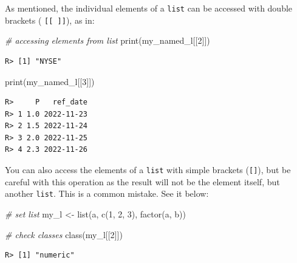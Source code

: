 \documentclass[
  12pt,
]{book}
\newenvironment{Shaded}{\begin{snugshade}}{\end{snugshade}}
\newcommand{\CommentTok}[1]{\textcolor[rgb]{0.37,0.37,0.37}{\textit{#1}}}
\newcommand{\DecValTok}[1]{\textcolor[rgb]{0.06,0.06,0.06}{#1}}
\newcommand{\FunctionTok}[1]{\textcolor[rgb]{0,0,0}{#1}}
\newcommand{\NormalTok}[1]{#1}
\newcommand{\OtherTok}[1]{\textcolor[rgb]{0.37,0.37,0.37}{#1}}
\newcommand{\StringTok}[1]{\textcolor[rgb]{0.5,0.5,0.5}{#1}}
\begin{document}
As mentioned, the individual elements of a \texttt{list} can be accessed with double brackets ( \texttt{{[}{[}\ {]}{]}}), as in: \index{[[ ]]}

\begin{Shaded}
\begin{Highlighting}[]
\CommentTok{\# accessing elements from list}
\FunctionTok{print}\NormalTok{(my\_named\_l[[}\DecValTok{2}\NormalTok{]])}
\end{Highlighting}
\end{Shaded}

\begin{verbatim}
R> [1] "NYSE"
\end{verbatim}

\begin{Shaded}
\begin{Highlighting}[]
\FunctionTok{print}\NormalTok{(my\_named\_l[[}\DecValTok{3}\NormalTok{]])}
\end{Highlighting}
\end{Shaded}

\begin{verbatim}
R>     P   ref_date
R> 1 1.0 2022-11-23
R> 2 1.5 2022-11-24
R> 3 2.0 2022-11-25
R> 4 2.3 2022-11-26
\end{verbatim}

You can also access the elements of a \texttt{list} with simple brackets (\texttt{{[}{]}}), but be careful with this operation as the result will not be the element itself, but another \texttt{list}. This is a common mistake. See it below:

\begin{Shaded}
\begin{Highlighting}[]
\CommentTok{\# set list}
\NormalTok{my\_l }\OtherTok{\textless{}{-}} \FunctionTok{list}\NormalTok{(}\StringTok{\textquotesingle{}a\textquotesingle{}}\NormalTok{,}
             \FunctionTok{c}\NormalTok{(}\DecValTok{1}\NormalTok{, }\DecValTok{2}\NormalTok{, }\DecValTok{3}\NormalTok{),}
             \FunctionTok{factor}\NormalTok{(}\StringTok{\textquotesingle{}a\textquotesingle{}}\NormalTok{, }\StringTok{\textquotesingle{}b\textquotesingle{}}\NormalTok{))}

\CommentTok{\# check classes}
\FunctionTok{class}\NormalTok{(my\_l[[}\DecValTok{2}\NormalTok{]])}
\end{Highlighting}
\end{Shaded}

\begin{verbatim}
R> [1] "numeric"
\end{verbatim}
\end{document}
